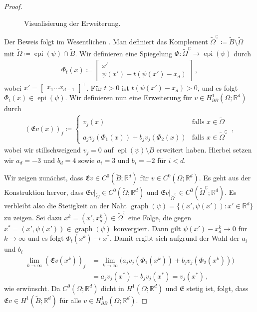 \documentclass{scrartcl}
\def\R{\mathbb{R}}
\newcommand{\tiOmega}{\tilde{\Omega}}
\newcommand{\tiB}{\tilde{B}}
\newcommand{\erw}{\mathfrak{E}}			%
\DeclareMathOperator{\epi}{epi}			%
\DeclareMathOperator{\graph}{graph}			%
\newcommand{\vect}[1]{\begin{bmatrix} #1 \end{bmatrix}}
\begin{document}
\begin{proof}
	\begin{figure}[h]
	\centering
	
	\caption{Visualisierung der Erweiterung.}
	\end{figure}
	
	Der Beweis folgt im Wesentlichen \cite{Nit-1981}. Man definiert das Komplement $\tiOmega^\complement\coloneqq \tiB\setminus\tiOmega$ mit $\tiOmega\coloneqq\epi(\psi)\cap\tiB$.
	Wir definieren eine Spiegelung $\Phi\colon\tiOmega^\complement\to\epi(\psi)$ durch
	\begin{align*}
		\Phi_t(x)\coloneqq\vect{x' \\ \psi(x')+t(\psi(x')-x_d)}\,,
	\end{align*}
	wobei $x'=\vect{x_1 \dots x_{d-1}}^\top$. Für $t>0$ ist $t(\psi(x')-x_d)>0$, und es folgt $\Phi_t(x)\in\epi(\psi)$.
	Wir definieren nun eine Erweiterung für $v\in H^1_{\partial B}(\Omega;\R^d)$ durch
	\begin{align*}
		(\erw v(x))_j\coloneqq\begin{cases}
			v_j(x) &\text{falls }x\in\tiOmega\\
			a_j v_j(\Phi_1(x))+b_j v_j(\Phi_2(x)) &\text{falls }x\in\tiOmega^\complement
		\end{cases}\,,
	\end{align*}
	wobei wir stillschweigend $v_j=0$ auf $\epi(\psi)\setminus B$ erweitert haben. Hierbei setzen wir $a_d=-3$ und $b_d=4$ sowie $a_i=3$ und $b_i=-2$ für $i<d$.
	
	Wir zeigen zunächst, dass $\erw v\in C^0(\tiB;\R^d)$ für $v\in C^0(\Omega;\R^d)$. Es geht aus der Konstruktion hervor, dass $\erw v\big\vert_{\tiOmega}\in C^0(\tiOmega;\R^d)$ und $\erw v\big\vert_{\tiOmega^\complement}\in C^0(\tiOmega^\complement;\R^d)$. Es verbleibt also die Stetigkeit an der Naht $\graph(\psi)=\{(x',\psi(x'))\colon x'\in\R^d\}$ zu zeigen.
	Sei dazu $x^k=(x',x_d^k)\in\tiOmega^\complement$ eine Folge, die gegen $x^*=(x',\psi(x'))\in \graph(\psi)$ konvergiert. Dann gilt $\psi(x')-x_d^k\to0$ für $k\to\infty$ und es folgt $\Phi_t(x^k)\to x^*$. Damit ergibt sich aufgrund der Wahl der $a_i$ und $b_i$
	\begin{align*}
		\lim_{k\to\infty}(\erw v(x^k))_j&=\lim_{k\to\infty}
		\big(a_jv_j(\Phi_1(x^k))+b_jv_j(\Phi_2(x^k))\big)\\
		&=a_jv_j(x^*)+b_jv_j(x^*)
		= v_j(x^*)\,,
	\end{align*}
	wie erwünscht. Da $C^0(\Omega;\R^d)$ dicht in $H^1(\Omega;\R^d)$ und $\erw$ stetig ist, folgt, dass $\erw v\in H^1(\tiB;\R^d)$ für  alle $v\in H^1_{\partial B}(\Omega;\R^d)$.
	

\end{proof}
\end{document}
